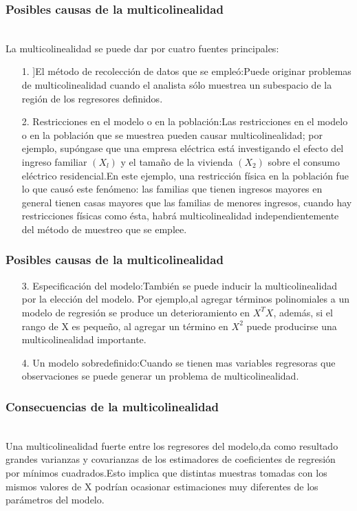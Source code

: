 \documentclass[12pt]{beamer}
\begin{document}
\begin{frame}
\frametitle{Posibles causas de la multicolinealidad}
~\\La multicolinealidad se puede dar por cuatro fuentes principales:
\begin{itemize}
\item[1.]]El método de recolección de datos que se empleó:Puede originar problemas de multicolinealidad cuando el analista sólo muestrea un subespacio de la región de los regresores definidos.
\item[2.]Restricciones en el modelo o en la población:Las restricciones en el modelo o en la población que se muestrea pueden causar multicolinealidad; por ejemplo, supóngase que una empresa eléctrica está investigando el efecto del ingreso familiar $(X_{l})$ y el tamaño de la vivienda $(X_{2})$ sobre el consumo eléctrico residencial.En este ejemplo, una restricción física en la población fue lo que causó este fenómeno: las familias que tienen ingresos mayores en general tienen casas mayores que las familias de menores ingresos, cuando hay restricciones físicas como ésta, habrá multicolinealidad independientemente del método de muestreo que se emplee.
\end{itemize}
\end{frame}

\begin{frame}
\frametitle{Posibles causas de la multicolinealidad}
\begin{itemize}
\item[3.]Especificación del modelo:También se puede inducir la multicolinealidad por la elección del modelo. Por ejemplo,al agregar términos polinomiales a un modelo de regresión se produce un deterioramiento en $X^{T}X$, además, si el rango de X es pequeño, al agregar un término en $X^{2}$ puede producirse una multicolinealidad importante. 
\item[4.]Un modelo sobredefinido:Cuando se tienen mas variables regresoras que observaciones se puede generar un problema de multicolinealidad.
\end{itemize}
\end{frame}


\begin{frame}
\frametitle{Consecuencias de la multicolinealidad}
~\\Una multicolinealidad fuerte entre los regresores del modelo,da como resultado grandes varianzas y covarianzas de los estimadores de coeficientes de regresión por mínimos cuadrados.Esto implica que distintas muestras tomadas con los mismos valores de X podrían ocasionar estimaciones muy diferentes de los parámetros del modelo.
\end{frame}
\end{document}
